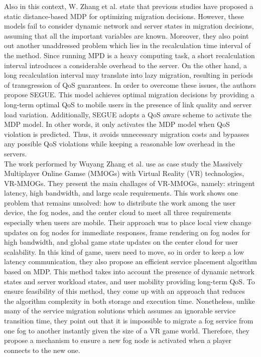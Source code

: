 \noindent\tab Also in this context, W. Zhang et al. \cite{zhang2016segue} state that previous studies have proposed a static distance-based MDP for optimizing migration decisions. However, these models fail to consider dynamic network and server states in migration decisions, assuming that all the important variables are known. Moreover, they also point out another unaddressed problem which lies in the recalculation time interval of the method. Since running MPD is a heavy computing task, a short recalculation interval introduces a considerable overhead to the server. On the other hand, a long recalculation interval may translate into lazy migration, resulting in periods of transgression of QoS guarantees. In order to overcome these issues, the authors propose SEGUE. This model achieves optimal migration decisions by providing a long-term optimal QoS to mobile users in the presence of link quality and server load variation. Additionally, SEGUE adopts a QoS aware scheme to activate the MDP model. In other words, it only activates the MDP model when QoS violation is predicted. Thus, it avoids unnecessary migration costs and bypasses any possible QoS violations while keeping a reasonable low overhead in the servers.\\
\noindent\tab The work performed by Wuyang Zhang et al. \cite{zhang2017towards} use as case study the Massively Multiplayer Online Gamse (MMOGs) with Virtual Reality (VR) technologies, VR-MMOGs. They present the main challages of VR-MMOGs, namely: stringent latency, high bandwidth, and large scale requirements. This work shows one problem that remains unsolved: how to distribute the work among the user device, the fog nodes, and the center cloud to meet all three requirements especially when users are mobile. Their approach was to place local view change updates on fog nodes for immediate responses, frame rendering on fog nodes for high bandwidth, and global game state updates on the center cloud for user scalability. In this kind of game, users need to move, so in order to keep a low latency communication, they also propose an efficient service placement algorithm based on MDP. This method takes into account the presence of dynamic network states and server workload states, and user mobility providing long-term QoS. To ensure feasibility of this method, they come up with an approach that reduces the algorithm complexity in both storage and execution time. Nonetheless, unlike many of the service migration solutions which assumes an ignorable service transition time, they point out that it is impossible to migrate a fog service from one fog to another instantly given the size of a VR game world. Therefore, they propose a mechanism to ensure a new fog node is activated when a player connects to the new one.
